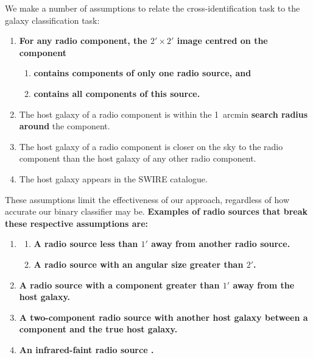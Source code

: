 \documentclass[fleqn,usenatbib,usedcolumn]{mnras}
\newcommand{\edited}[1]{{\bf {#1}}}
\begin{document}
    We make a number of assumptions to relate the cross-identification task to
    the galaxy classification task:
    \begin{enumerate}
      \item \edited{For any radio component, the $2' \times 2'$ image centred on the component} \begin{enumerate}
          \item \edited{contains components of only one radio source, and}
          \item \edited{contains all components of this source.}
        \end{enumerate}
      \item The host galaxy of a radio component is within the 1~arcmin \edited{search radius around} the
        component.
      \item The host galaxy of a radio component is closer on the sky to the
        radio component than the host galaxy of any other radio component.
      \item The host galaxy appears in the SWIRE catalogue.
    \end{enumerate}
    These assumptions limit the effectiveness of our approach, regardless of
    how accurate our binary classifier may be. \edited{Examples of radio sources that break these respective assumptions are:}
    \begin{enumerate}
      \item \mbox{}
        \begin{enumerate}
          \item \edited{A radio source less than $1'$ away from another radio source.}
          \item \edited{A radio source with an angular size greater than $2'$.}
        \end{enumerate}
      \item \edited{A radio source with a component greater than $1'$ away from the host galaxy.}
      \item \edited{A two-component radio source with another host galaxy between a component and the true host galaxy.}
      \item \edited{An infrared-faint radio source \citep[as in][]{collier14irfaint}.}
    \end{enumerate}
\end{document}
